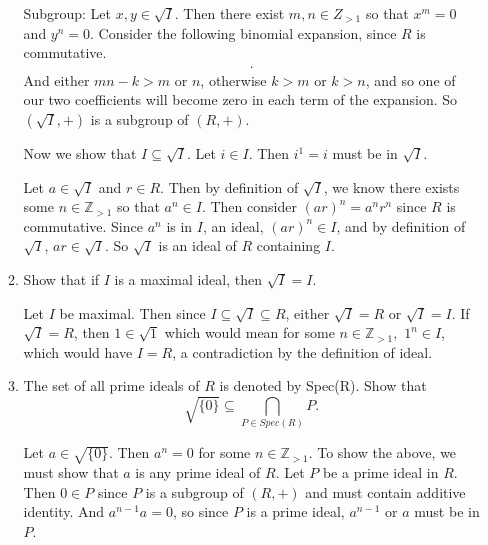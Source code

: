 \documentclass{article}
\begin{document}
\begin{enumerate}
\begin{enumerate}[label= (\alph*)]
        Subgroup: Let $x,y\in \sqrt{I} $. Then there exist $m,n\in Z_{>1}$ so that $x^{m}=0$ and $y^{n}=0$.
        Consider the following binomial expansion, since $R$ is commutative.
        \begin{align*}
        .\end{align*}
        And either $mn-k>m$ or $n$, otherwise $k>m$ or $k>n$, and so one of our two coefficients will become zero in each term of the
        expansion. So $(\sqrt{I},+)$ is a subgroup of $(R,+)$.

        Now we show that $I\subseteq \sqrt{I} $. Let $i\in I$. Then $i^1=i$ must be in $\sqrt{I} $.

        Let $a\in \sqrt{I} $ and $r\in R$. Then by definition of $\sqrt{I} $, we know there exists some $n\in \mathbb{Z}_{>1}$
        so that $a^n\in I$. Then consider $(ar)^{n}=a^{n}r^{n}$ since $R$ is commutative. Since $a^{n}$ is in $I$, 
        an ideal, $(ar)^{n}\in I$, and by definition of $\sqrt{I} $, $ar\in \sqrt{I} $. So 
        $\sqrt{I} $ is an ideal of $R$ containing $I$.

        \item Show that if $I$ is a maximal ideal, then $\sqrt{ I} = I$.

        Let $I$ be maximal. Then since $I\subseteq \sqrt{I} \subseteq R$, either $\sqrt{I}=R$ or
        $\sqrt{I}=I$. If $\sqrt{I} =R$, then $1\in \sqrt{1} $ which would mean for some
        $n\in \mathbb{Z}_{>1},$ $1^{n}\in I$, which would have $I=R$, a contradiction by the definition of ideal.

        \item The set of all prime ideals of $R$ is denoted by Spec(R). Show that
        \[ \sqrt{\{0\} } \subseteq \bigcap_{P\in Spec(R)} P .\] 

        Let $a\in \sqrt{\{0\} } $. Then $a^{n}=0$ for some $n\in \mathbb{Z}_{>1}$. To show the above,
        we must show that $a$ is any prime ideal of $R$. Let $P$ be a prime ideal in $R$.
        Then $0\in P$ since $P$ is a subgroup of $(R,+)$ and must contain additive identity.
        And $a^{n-1}a=0$, so since $P$ is a prime ideal, $a^{n-1}$ or $a$ must be in $P$.


\end{enumerate}
\end{enumerate}
\end{document}
